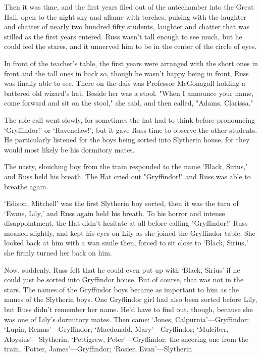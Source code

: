 Then it was time, and the first years filed out of the antechamber into the Great Hall, open to the night sky and aflame with torches, pulsing with the laughter and chatter of nearly two hundred fifty students, laughter and chatter that was stilled as the first years entered. Russ wasn't tall enough to see much, but he could feel the stares, and it unnerved him to be in the center of the circle of eyes.

In front of the teacher's table, the first years were arranged with the short ones in front and the tall ones in back so, though he wasn't happy being in front, Russ was finally able to see. There on the dais was Professor McGonagall holding a battered old wizard's hat. Beside her was a stool. "When I announce your name, come forward and sit on the stool," she said, and then called, "Adams, Clarissa."

The role call went slowly, for sometimes the hat had to think before pronouncing `Gryffindor!' or `Ravenclaw!', but it gave Russ time to observe the other students. He particularly listened for the boys being sorted into Slytherin house, for they would most likely be his dormitory mates.

The nasty, slouching boy from the train responded to the name `Black, Sirius,' and Russ held his breath. The Hat cried out "Gryffindor!" and Russ was able to breathe again.

`Edison, Mitchell' was the first Slytherin boy sorted, then it was the turn of `Evans, Lily,' and Russ again held his breath. To his horror and intense disappointment, the Hat didn't hesitate at all before calling "Gryffindor!" Russ moaned slightly, and kept his eyes on Lily as she joined the Gryffindor table. She looked back at him with a wan smile then, forced to sit close to `Black, Sirius,' she firmly turned her back on him.

Now, suddenly, Russ felt that he could even put up with `Black, Sirius' if he could just be sorted into Gryffindor house. But of course, that was not in the stars. The names of the Gryffindor boys became as important to him as the names of the Slytherin boys. One Gryffindor girl had also been sorted before Lily, but Russ didn't remember her name. He'd have to find out, though, because she was one of Lily's dormitory mates. Then came: `Jones, Calpurnia'—Gryffindor; `Lupin, Remus'—Gryffindor; `Macdonald, Mary'—Gryffindor; `Mulciber, Aloysius'—Slytherin; `Pettigrew, Peter'—Gryffindor; the sneering one from the train, `Potter, James'—Gryffindor; `Rosier, Evan'—Slytherin{\el}

